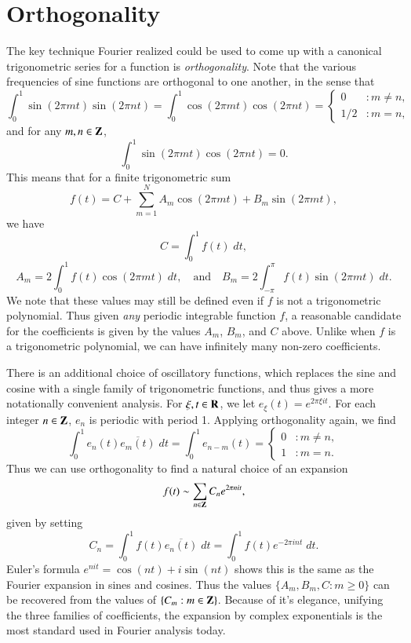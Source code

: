 \section{Orthogonality}

The key technique Fourier realized could be used to come up with a canonical trigonometric series for a function is \emph{orthogonality}. Note that the various frequencies of sine functions are orthogonal to one another, in the sense that
%
\[ \int_0^1 \sin(2 \pi mt) \sin(2\pi nt) = \int_0^1 \cos(2 \pi mt) \cos(2 \pi nt) = \begin{cases} 0 & : m \neq n, \\ 1/2 & : m = n, \end{cases} \]
%
and for any $m,n \in \operatorname{\mathbf{Z}}$,
%
\[ \int_0^1 \sin(2 \pi mt) \cos(2 \pi nt) = 0. \]
%
This means that for a finite trigonometric sum
%
\[ f(t) = C + \sum_{m = 1}^N A_m \cos(2 \pi mt) + B_m \sin(2 \pi mt), \]
%
we have
%
\[ C = \int_0^1 f(t)\; dt, \]
\[ A_m = 2 \int_0^1 f(t) \cos(2 \pi mt)\; dt, \quad\text{and}\quad B_m = 2 \int_{-\pi}^\pi f(t) \sin(2 \pi mt)\; dt. \]
%
We note that these values may still be defined even if $f$ is not a trigonometric polynomial. Thus given \emph{any} periodic integrable function $f$, a reasonable candidate for the coefficients is given by the values $A_m$, $B_m$, and $C$ above. Unlike when $f$ is a trigonometric polynomial, we can have infinitely many non-zero coefficients.

There is an additional choice of oscillatory functions, which replaces the sine and cosine with a single family of trigonometric functions, and thus gives a more notationally convenient analysis. For $\xi, t \in \operatorname{\mathbf{R}}$, we let $e_\xi(t) = e^{2 \pi \xi i t}$. For each integer $n \in \operatorname{\mathbf{Z}}$, $e_n$ is periodic with period 1. Applying orthogonality again, we find
%
\[ \int_0^1 e_n(t) \overline{e_m(t)}\; dt = \int_0^1 e_{n-m}(t) = \begin{cases} 0 & : m \neq n, \\ 1 & : m = n. \end{cases}  \]
%
Thus we can use orthogonality to find a natural choice of an expansion
%
\[ f(t) \sim \sum_{n \in \operatorname{\mathbf{Z}}} C_n e^{2 \pi nit}, \]
%
given by setting
%
\[ C_n = \int_0^1 f(t) \overline{e_n(t)}\; dt = \int_0^1 f(t) e^{- 2 \pi i n t}\; dt. \]
%
Euler's formula $e^{nit} = \cos(nt) + i \sin(nt)$ shows this is the same as the Fourier expansion in sines and cosines. Thus the values $\{ A_m, B_m, C : m \geq 0 \}$ can be recovered from the values of $\{ C_m : m \in \operatorname{\mathbf{Z}} \}$. Because of it's elegance, unifying the three families of coefficients, the expansion by complex exponentials is the most standard used in Fourier analysis today.

